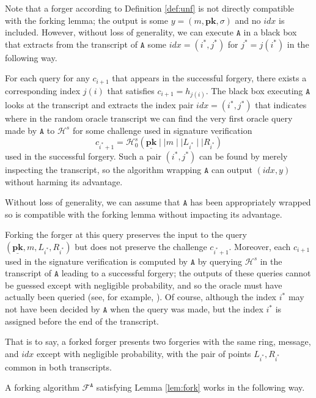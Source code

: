 \documentclass{mrl}
\theoremstyle{plain}
\theoremstyle{definition}
\begin{document}
Note that a forger according to Definition \ref{def:unf} is not directly compatible with the forking lemma; the output is some $y = (m, \textbf{pk}, \sigma)$ and no $\textit{idx}$ is included.  However, without loss of generality, we can execute $\texttt{A}$ in a black box that extracts from the transcript of $\texttt{A}$ some $\textit{idx} = (i^*, j^*)$ for $j^* = j(i^*)$ in the following way. 

For each query for any $c_{i+1}$ that appears in the successful forgery, there exists a corresponding index $j(i)$ that satisfies $c_{i+1} = h_{j(i)}$. The black box executing $\texttt{A}$ looks at the transcript and extracts the index pair $\textit{idx} = (i^*, j^*)$ that indicates where in the random oracle transcript we can find the very first oracle query made by $\texttt{A}$ to $\mathcal{H}^s$ for some challenge used in signature verification \[c_{i^*+1} = \mathcal{H}^s_0\left(\underline{\textbf{pk}} \mid \mid m \mid \mid L_{i^*} \mid \mid R_{i^*}\right)\] used in the successful forgery. Such a pair $(i^*, j^*)$ can be found by merely inspecting the transcript, so the algorithm wrapping $\texttt{A}$ can output $(\textit{idx}, y)$ without harming its advantage. 

Without loss of generality, we can assume that $\texttt{A}$ has been appropriately wrapped so is compatible with the forking lemma without impacting its advantage. 

Forking the forger at this query preserves the input to the query $(\underline{\textbf{pk}}, m, L_{i^*}, R_{i^*})$ but does not preserve the challenge $c_{i^*+1}$. Moreover, each $c_{i+1}$ used in the signature verification is computed by $\texttt{A}$ by querying $\mathcal{H}^s$  in the transcript of $\texttt{A}$ leading to a successful forgery; the outputs of these queries cannot be guessed except with negligible probability, and so the oracle must have actually been queried  (see, for example, \cite{liu}). Of course, although the index $i^*$ may not have been decided by $\texttt{A}$ when the query was made, but the index $i^*$ is assigned before the end of the transcript. 

That is to say, a forked forger presents two forgeries with the same ring, message, and $\textit{idx}$ except with negligible probability, with the pair of points $L_{i^*}, R_{i^*}$ common in both transcripts.

A forking algorithm $\mathcal{F}^\texttt{A}$ satisfying Lemma \ref{lem:fork} works in the following way.
\end{document}
